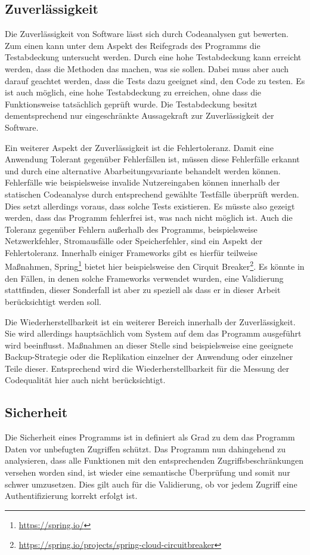\documentclass[
	oneside,  %
	ngerman, 
	final, 
	11pt, 
	a4paper, 
	1.1headlines, 
	headinclude=false, 
	footinclude=false, 
	mpinclude=false, 
	pagesize, 
	onecolumn, 
	titlepage, 
	parskip=half, 
	headsepline, 
	chapterprefix=false, 
	version=first, 
	listof=totoc, 
	bibliography=totoc, 
	toc=graduated, 
	fleqn
]{scrbook}
\begin{document}
\subsection{Zuverlässigkeit}
Die Zuverlässigkeit von Software lässt sich durch Codeanalysen gut bewerten.
Zum einen kann unter dem Aspekt des Reifegrads des Programms die Testabdeckung untersucht werden.
Durch eine hohe Testabdeckung kann erreicht werden, dass die Methoden das machen, was sie sollen.
Dabei muss aber auch darauf geachtet werden, dass die Tests dazu geeignet sind, den Code zu testen.
Es ist auch möglich, eine hohe Testabdeckung zu erreichen, ohne dass die Funktionsweise tatsächlich geprüft wurde.
Die Testabdeckung besitzt dementsprechend nur eingeschränkte Aussagekraft zur Zuverlässigkeit der Software.

Ein weiterer Aspekt der Zuverlässigkeit ist die Fehlertoleranz.
Damit eine Anwendung Tolerant gegenüber Fehlerfällen ist, müssen diese Fehlerfälle erkannt und durch eine alternative Abarbeitungsvariante behandelt werden können.
Fehlerfälle wie beispielsweise invalide Nutzereingaben können innerhalb der statischen Codeanalyse durch entsprechend gewählte Testfälle überprüft werden.
Dies setzt allerdings voraus, dass solche Tests existieren.
Es müsste also gezeigt werden, dass das Programm fehlerfrei ist, was nach \cite{Di1972} nicht möglich ist.
Auch die Toleranz gegenüber Fehlern außerhalb des Programms, beispielsweise Netzwerkfehler, Stromausfälle oder Speicherfehler, sind ein Aspekt der Fehlertoleranz.
Innerhalb einiger Frameworks gibt es hierfür teilweise Maßnahmen, Spring\footnote{\url{https://spring.io/}} bietet hier beispielsweise den Cirquit Breaker\footnote{\url{https://spring.io/projects/spring-cloud-circuitbreaker}}.
Es könnte in den Fällen, in denen solche Frameworks verwendet wurden, eine Validierung stattfinden, dieser Sonderfall ist aber zu speziell als dass er in dieser Arbeit berücksichtigt werden soll.

Die Wiederherstellbarkeit ist ein weiterer Bereich innerhalb der Zuverlässigkeit.
Sie wird allerdings hauptsächlich vom System auf dem das Programm ausgeführt wird beeinflusst.
Maßnahmen an dieser Stelle sind beispielsweise eine geeignete Backup-Strategie oder die Replikation einzelner der Anwendung oder einzelner Teile dieser.
Entsprechend wird die Wiederherstellbarkeit für die Messung der Codequalität hier auch nicht berücksichtigt.

\subsection{Sicherheit}
Die Sicherheit eines Programms ist in \cite{ISO-25010} definiert als Grad zu dem das Programm Daten vor unbefugten Zugriffen schützt.
Das Programm nun dahingehend zu analysieren, dass alle Funktionen mit den entsprechenden Zugriffsbeschränkungen versehen worden sind, ist wieder eine semantische Überprüfung und somit nur schwer umzusetzen.
Dies gilt auch für die Validierung, ob vor jedem Zugriff eine Authentifizierung korrekt erfolgt ist.
\end{document}
